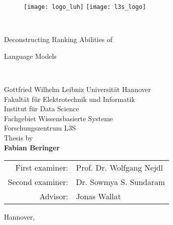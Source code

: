 \thispagestyle{empty}

{\sffamily
	\begin{figure}
		\texttt{[image: logo\_luh]}
		\hfill
		\texttt{[image: l3s\_logo]}
	\end{figure}
	\begin{center}
		\mbox{} \\
		\vspace{1.5cm}
		\huge{Deconstructing Ranking Abilities of

			Language Models}\\
		\vspace{1.8cm}
		{\large
			Gottfried Wilhelm Leibniz Universität Hannover\\
			Fakultät für Elektrotechnik und Informatik\\
			Institut für Data Science \\
			Fachgebiet Wissensbasierte Systeme \\
			Forschungszentrum L3S \\
			\vspace{1.8cm}
			Thesis by \\
			\textbf{Fabian Beringer} \\
			\vspace{1.8cm}
			\begin{tabular}{rl}
				First examiner:  & Prof. Dr. Wolfgang Nejdl \\
				Second examiner: & Dr. Sowmya S. Sundaram   \\
				Advisor:         & Jonas Wallat             \\
			\end{tabular}
			\vfill
			Hannover, \handindate
		}
	\end{center}
}
\newpage
